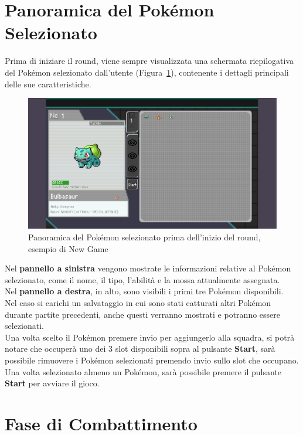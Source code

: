 \documentclass[a4paper,12pt]{report}
\begin{document}
{{\section{Panoramica del Pokémon Selezionato}

Prima di iniziare il round, viene sempre visualizzata una schermata riepilogativa del Pokémon selezionato dall’utente (Figura~\ref{fig:pokemon_panorama}), contenente i dettagli principali delle sue caratteristiche.

\begin{figure}[H]
  \centering
  \includegraphics[width=\textwidth]{immagini/schermataBox.png}
  \caption{Panoramica del Pokémon selezionato prima dell'inizio del round, esempio di New Game}
  \label{fig:pokemon_panorama}
\end{figure}

Nel \textbf{pannello a sinistra} vengono mostrate le informazioni relative al Pokémon selezionato, come il nome, il tipo, l’abilità e la mossa attualmente assegnata.\\
Nel \textbf{pannello a destra}, in alto, sono visibili i primi tre Pokémon disponibili.\\
Nel caso si carichi un salvataggio in cui sono stati catturati altri Pokémon durante partite precedenti, anche questi verranno mostrati e potranno essere selezionati.\\
Una volta scelto il Pokémon premere invio per aggiungerlo alla squadra, si potrà notare che occuperà uno dei 3 slot disponibili sopra al pulsante \textbf{Start}, sarà possibile rimuovere i Pokémon selezionati premendo invio sullo slot che occupano.\\
Una volta selezionato almeno un Pokémon, sarà possibile premere il pulsante \textbf{Start} per avviare il gioco.

\section{Fase di Combattimento}

}}
\end{document}
